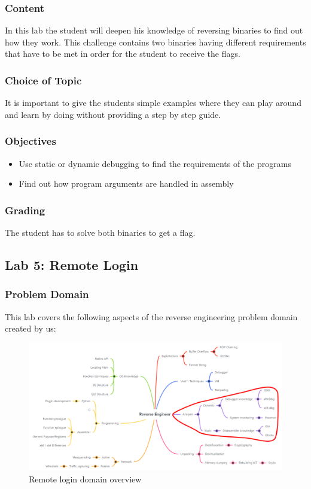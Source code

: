 \subsubsection*{Content}
In this lab the student will deepen his knowledge of reversing binaries to find out how they work. This challenge contains two binaries having different requirements that have to be met in order for the student to receive the flags.
\subsubsection*{Choice of Topic}
It is important to give the students simple examples where they can play around and learn by doing without providing a step by step guide.
\subsubsection*{Objectives}
\begin{itemize}
    \item Use static or dynamic debugging to find the requirements of the programs
    \item Find out how program arguments are handled in assembly
\end{itemize}
\subsubsection*{Grading}
The student has to solve both binaries to get a flag.
\pagebreak

\subsection{Lab 5: Remote Login}
\subsubsection*{Problem Domain}
This lab covers the following aspects of the reverse engineering problem domain created by us:
\vspace{-2ex}
\begin{figure}[H]
    \includegraphics[width=\textwidth]{resources/remotelogin-overview-light.png}
    \caption{Remote login domain overview}
    \label{fig:remotelogin-overview}
\end{figure}
